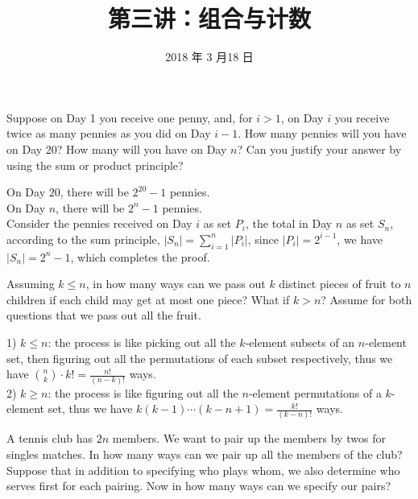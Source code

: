 \documentclass[11pt, a4paper, UTF8]{ctexart}
\title{第三讲：组合与计数}
\date{2018 年 3 月18 日}     %
\begin{document}
\maketitle
\noplagiarism	%
\beginthishw	%

\begin{problem}[CS: 1.1.13]	%
  Suppose on Day 1 you receive one penny, and, for $i > 1$, on Day $i$ you receive 
  twice as many pennies as you did on Day $i - 1$. How many pennies will you have on 
  Day 20? How many will you have on Day $n$? Can you justify your answer by using the 
  sum or product principle?
\end{problem}



\begin{solution}
  On Day $20$, there will be $2^{20} - 1$ pennies.\\
  On Day $n$, there will be $2^{n} - 1$ pennies.\\
  Consider the pennies received on Day $i$ as set $P_{i}$, the total in Day $n$ 
  as set $S_{n}$, according to the sum principle, $|S_{n}| = \sum_{i = 1}^{n} |P_{i}|$, 
  since $|P_{i}| = 2^{i - 1}$, we have $|S_{n}| = 2^{n} - 1$, which completes the proof.
\end{solution}

\begin{problem}[CS: 1.2.5]
  Assuming $k \leq n$, in how many ways can we pass out $k$ distinct pieces of fruit 
  to $n$ children if each child may get at most one piece? What if $k > n$? Assume 
  for both questions that we pass out all the fruit.
\end{problem}

\begin{solution}
  1) $k \leq n$: the process is like picking out all the $k$-element subsets of an 
  $n$-element set, then figuring out all the permutations of each subset 
  respectively, thus we have $\binom{n}{k} \cdot k! = \frac{n!}{(n-k)!}$ ways.\\
  2) $k \geq n$: the process is like figuring out all the $n$-element permutations of 
  a $k$-element set, thus we have $k(k-1)\cdots(k-n+1) = \frac{k!}{(k-n)!}$ ways.
\end{solution}
\begin{problem}[CS: 1.2.15]
  A tennis club has $2n$ members. We want to pair up the members by twos for singles 
  matches. In how many ways can we pair up all the members of the club? Suppose that 
  in addition to specifying who plays whom, we also determine who serves first for 
  each pairing. Now in how many ways can we specify our pairs?
\end{problem}
\end{document}
